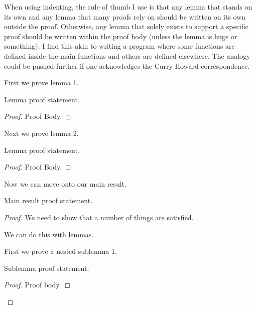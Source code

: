 \begin{enumerate}
        When using indenting, the rule of thumb I use is that any lemma that stands on its own and any lemma that many proofs rely on should be written on its own outside the proof. Otherwise, any lemma that solely exists to support a specific proof should be written within the proof body (unless the lemma is huge or something). I find this akin to writing a program where some functions are defined inside the main functions and others are defined elsewhere. The analogy could be pushed further if one acknowledges the Curry-Howard correspondence.

        First we prove lemma 1.

        \begin{lem}
          Lemma proof statement.
        \end{lem}
        \begin{proof}
          Proof Body. 
        \end{proof}

        Next we prove lemma 2.

        \begin{lem}
          Lemma proof statement.
        \end{lem}
        \begin{proof}
          Proof Body. 
        \end{proof}

        Now we can move onto our main result.

        \begin{thm}
          Main result proof statement.
        \end{thm}
        \begin{proof}
          We need to show that a number of things are satisfied.

          We can do this with lemmas.

          First we prove a nested sublemma 1.
          \begin{addmargin}{1cm}
            \renewcommand{\qedsymbol}{$\contradiction$}
            \begin{lem}
              Sublemma proof statement.
            \end{lem}
            \begin{proof}
              Proof body. 
            \end{proof}
            \renewcommand{\qedsymbol}{$\square$}
          \end{addmargin}


\end{proof}
\end{enumerate}
